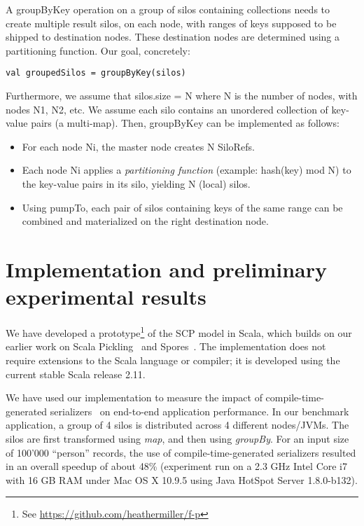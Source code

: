 \documentclass{easychair}
\begin{document}
A groupByKey operation on a group of silos containing collections needs to create multiple result silos, on each node, with ranges of keys supposed to be shipped to destination nodes. These destination nodes are determined using a partitioning function. Our goal, concretely:
\begin{verbatim}
val groupedSilos = groupByKey(silos)
\end{verbatim}
\noindent
Furthermore, we assume that silos.size = N where N is the number of nodes,
with nodes N1, N2, etc. We assume each silo contains an unordered collection
of key-value pairs (a multi-map). Then, groupByKey can be implemented as
follows:
\begin{itemize}
\item For each node Ni, the master node creates N SiloRefs.
\item Each node Ni applies a \emph{partitioning function} (example: hash(key) mod N) to
      the key-value pairs in its silo, yielding N (local) silos.
\item Using pumpTo, each pair of silos containing keys of the same range can be combined
      and materialized on the right destination node.
\end{itemize}



\section{Implementation and preliminary experimental results}
\label{sec:experimental}

We have developed a prototype\footnote{See \url{https://github.com/heathermiller/f-p}}
of the SCP model in Scala, which builds on our earlier work on
Scala Pickling~\cite{MillerHBO13} and Spores~\cite{MillerHO14}.
The implementation does not require extensions to the Scala language or compiler; it
is developed using the current stable Scala release 2.11.

We have used our implementation to measure the impact of
compile-time-generated serializers~\cite{MillerHBO13} on end-to-end application
performance. In our benchmark application, a group of 4 silos is distributed
across 4 different nodes/JVMs. The silos are first transformed using
\emph{map}, and then using \emph{groupBy}. For an input size of 100'000 ``person''
records, the use of compile-time-generated serializers resulted in
an overall speedup of about 48\% (experiment run on a 2.3 GHz Intel Core i7
with 16 GB RAM under Mac OS X 10.9.5 using Java HotSpot Server 1.8.0-b132).
\end{document}
